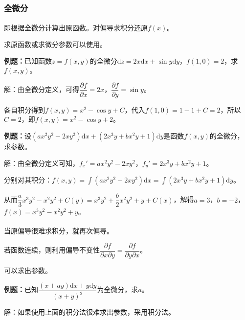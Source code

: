 \paragraph{} \leavevmode \medskip

\subsubsection{全微分}

\paragraph{}\leavevmode \medskip

即根据全微分计算出原函数。对偏导求积分还原$f(x)$。

求原函数或求微分参数可以使用。

\textbf{例题：}已知函数$z=f(x,y)$的全微分$\textrm{d}z=2x\textrm{d}x+\sin y\textrm{d}y$，$f(1,0)=2$，求$f(x,y)$。

解：由全微分定义，可得$\dfrac{\partial f}{\partial x}=2x$，$\dfrac{\partial f}{\partial y}=\sin y$。

各自积分得到$f(x,y)=x^2-\cos y+C$，代入$f(1,0)=1-1+C=2$，所以$C=2$，即$f(x,y)=x^2-\cos y+2$。

\textbf{例题：}设$(ax^2y^2-2xy^2)\textrm{d}x+(2x^3y+bx^2y+1)\textrm{d}y$是函数$f(x,y)$的全微分，求参数。

解：由全微分定义可知，$f_x'=ax^2y^2-2xy^2$，$f_y'=2x^3y+bx^2y+1$。

分别对其积分：$f(x,y)=\int(ax^2y^2-2xy^2)\textrm{d}x=\int(2x^3y+bx^2y+1)\textrm{d}y$。

从而$\dfrac{a}{3}x^3y^2-x^2y^2+C(y)=x^3y^2+\dfrac{b}{2}x^2y^2+y+C(x)$，解得$a=3$，$b=-2$，$f(x)=x^3y^2-x^2y^2+y$。

\paragraph{}\leavevmode \medskip

当原偏导很难求积分，就再次偏导。

若函数连续，则利用偏导不变性$\dfrac{\partial f}{\partial x\partial y}=\dfrac{\partial f}{\partial y\partial x}$。

可以求出参数。

\textbf{例题：}已知$\dfrac{(x+ay)\textrm{d}x+y\textrm{d}y}{(x+y)^2}$为全微分，求$a$。

解：如果使用上面的积分法很难求出参数，采用积分法。

